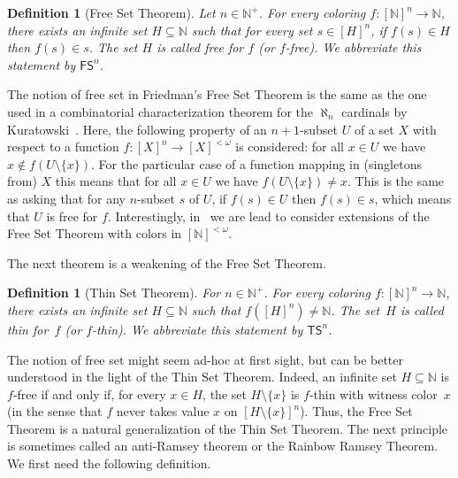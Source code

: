 \documentclass[10pt,a4paper]{article}
\newcommand{\FS}[0]{\mathsf{FS}}
\newcommand{\TS}[0]{\mathsf{TS}}
\newcommand{\NN}[0]{\mathbb{N}}
\numberwithin{theorem}{section}
\newtheorem{definition}[theorem]{Definition}
\begin{document}
\begin{definition}[Free Set Theorem] Let $n\in\NN^+$.  
For every coloring $f:[\NN]^{n} \to \NN$, there exists an infinite set $H\subseteq \NN$ such that for every set $s\in [H]^{n}$, if $f(s) \in H$ then $f(s) \in s$. The set $H$ is called \emph{free} for $f$ (or $f$-free). We abbreviate this statement by $\FS^n$.
\end{definition}

The notion of free set in Friedman's Free Set Theorem is the same as the one used in a combinatorial characterization theorem for the $\aleph_n$ cardinals by Kuratowski~\cite{Kur:51}. Here, the following property of an $n+1$-subset $U$ of a set $X$ with respect to a function $f:[X]^n \to [X]^{<\omega}$ is considered: for all $x\in U$ we have $x \notin f(U\setminus\{x\})$. For the particular case of a function mapping in (singletons from) $X$ this means that for all $x\in U$ we have $f(U\setminus \{x\}) \neq x$. This is the same as asking that for any $n$-subset $s$ of $U$, if $f(s) \in U$ then $f(s) \in s$, which means that $U$ is free for $f$. Interestingly, in~ we are lead to consider extensions of the Free Set Theorem with colors in $[\NN]^{<\omega}$. %

The next theorem is a weakening of the Free Set Theorem. %

\begin{definition}[Thin Set Theorem] For $n\in \NN^+$. 
For every coloring $f:[\NN]^n \to \NN$, there exists an infinite set $H\subseteq \NN$ such that
$f([H]^n) \neq \NN$. The set~$H$ is called \emph{thin} for~$f$ (or $f$-thin). We abbreviate this statement by $\TS^n$.
\end{definition}

The notion of free set might seem ad-hoc at first sight, but can be better understood in the light of the Thin Set Theorem. Indeed, an infinite set $H \subseteq \NN$ is $f$-free if and only if, for every $x \in H$, the set $H \setminus \{x\}$ is $f$-thin with witness color~$x$ (in the sense that $f$ never takes value $x$ on $[H\setminus \{x\}]^n$). Thus, the Free Set Theorem is a natural generalization of the Thin Set Theorem.
The next principle is sometimes called an anti-Ramsey theorem or the Rainbow Ramsey Theorem.
We first need the following definition.
\end{document}
